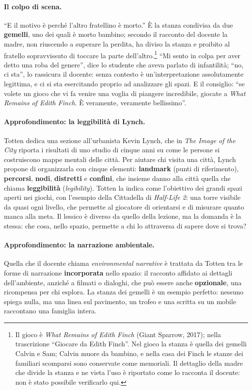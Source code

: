 \paragraph{Il colpo di scena.} ``E il motivo è perché l'altro fratellino è morto.'' È la
stanza condivisa da due \textbf{gemelli}, uno dei quali è morto bambino; secondo il
racconto del docente la madre, non riuscendo a superare la perdita, ha diviso la stanza e
proibito al fratello sopravvissuto di toccare la parte dell'altro.\footnote{Il gioco è
\emph{What Remains of Edith Finch} (Giant Sparrow, 2017); nella trascrizione ``Giocare da
Edith Finch''. Nel gioco la stanza è quella dei gemelli Calvin e Sam; Calvin muore da
bambino, e nella casa dei Finch le stanze dei familiari scomparsi sono conservate come
memoriali. Il dettaglio della madre che divide la stanza e ne vieta l'uso è riportato come
lo racconta il docente: non è stato possibile verificarlo qui.} ``Mi sento in colpa per
aver detto una roba del genere'', dice lo studente che aveva parlato di infantilità; ``no,
ci sta'', lo rassicura il docente: senza contesto è un'interpretazione assolutamente
legittima, e ci si sta esercitando proprio ad analizzare gli spazi. E il consiglio: ``se
volete un gioco che vi fa venire una voglia di piangere incredibile, giocate a \emph{What
Remains of Edith Finch}. È veramente, veramente bellissimo''.

\paragraph{Approfondimento: la leggibilità di Lynch.} Totten dedica una sezione
all'urbanista Kevin Lynch, che in \emph{The Image of the City} riporta i risultati di uno
studio di cinque anni su come le persone si costruiscono mappe mentali delle città. Per
aiutare chi visita una città, Lynch propone di organizzarla con cinque elementi:
\textbf{landmark} (punti di riferimento), \textbf{percorsi}, \textbf{nodi},
\textbf{distretti} e \textbf{confini}, che insieme danno alla città quella che chiama
\textbf{leggibilità} (\emph{legibility}). Totten la indica come l'obiettivo dei grandi
spazi aperti nei giochi, con l'esempio della Cittadella di \emph{Half-Life 2}: una torre
visibile da quasi ogni livello, che permette al giocatore di orientarsi e di misurare quanto
manca alla meta. Il lessico è diverso da quello della lezione, ma la domanda è la stessa:
che cosa, nello spazio, permette a chi lo attraversa di sapere dove si trova?

\paragraph{Approfondimento: la narrazione ambientale.} Quella che il docente chiama
\emph{environmental narrative} è trattata da Totten tra le forme di narrazione
\textbf{incorporata} nello spazio: il racconto affidato ai dettagli dell'ambiente,
anziché a filmati o dialoghi, che può essere anche \textbf{opzionale}, una ricompensa per
chi esplora. La stanza dei gemelli è un esempio perfetto: nessuno spiega nulla, ma una
linea sul pavimento, un trofeo e una scritta su un mobile raccontano una famiglia intera.

